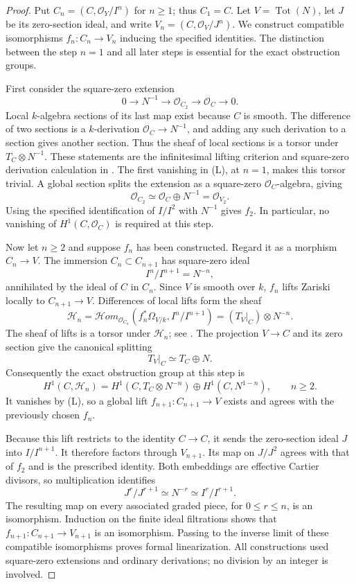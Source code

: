 \begin{proof}
Put $C_n=(C,\mathcal O_Y/I^n)$ for $n\geq1$; thus $C_1=C$.
Let $V=\operatorname{Tot}(N)$, let $J$ be its zero-section ideal,
and write $V_n=(C,\mathcal O_V/J^n)$.  We construct compatible
isomorphisms $f_n:C_n\to V_n$ inducing the specified identities.
The distinction between the step $n=1$ and all later steps is
essential for the exact obstruction groups.

First consider the square-zero extension
\[
 0\longrightarrow N^{-1}\longrightarrow\mathcal O_{C_2}
   \longrightarrow\mathcal O_C\longrightarrow0.
\]
Local $k$-algebra sections of its last map exist because $C$ is
smooth.  The difference of two sections is a $k$-derivation
$\mathcal O_C\to N^{-1}$, and adding any such derivation to a
section gives another section.  Thus the sheaf of local sections
is a torsor under $T_C\otimes N^{-1}$.  These statements are the
infinitesimal lifting criterion and square-zero derivation
calculation in
\cite[Lemmas 37.11.7 and 17.28.11, tags 02H6 and 01UP]
     {StacksBNegativeCurve}.
The first vanishing in (L), at $n=1$, makes this torsor trivial.
A global section splits the extension as a square-zero
$\mathcal O_C$-algebra, giving
\[
 \mathcal O_{C_2}\simeq\mathcal O_C\oplus N^{-1}
                       =\mathcal O_{V_2}.
\]
Using the specified identification of $I/I^2$ with $N^{-1}$
gives $f_2$.  In particular, no vanishing of $H^1(C,\mathcal O_C)$
is required at this step.

Now let $n\geq2$ and suppose $f_n$ has been constructed.
Regard it as a morphism $C_n\to V$.  The immersion
$C_n\subset C_{n+1}$ has square-zero ideal
\[
 I^n/I^{n+1}=N^{-n},
\]
annihilated by the ideal of $C$ in $C_n$.  Since $V$ is smooth
over $k$, $f_n$ lifts Zariski locally to $C_{n+1}\to V$.
Differences of local lifts form the sheaf
\[
 \mathcal H_n
  =\mathcal Hom_{\mathcal O_{C_n}}
       (f_n^*\Omega_{V/k},I^n/I^{n+1})
  =(T_V|_C)\otimes N^{-n}.
\]
The sheaf of lifts is a torsor under $\mathcal H_n$;
see \cite[Lemmas 37.9.4--5 and 37.11.7,
tags 04FH, 04FJ and 02H6]{StacksBNegativeCurve}.
The projection $V\to C$ and its zero section give the canonical
splitting
\[
 T_V|_C\simeq T_C\oplus N.
\]
Consequently the exact obstruction group at this step is
\[
 H^1(C,\mathcal H_n)
  =H^1(C,T_C\otimes N^{-n})\oplus H^1(C,N^{1-n}),
                  \qquad n\geq2.
 \tag{O}
\]
It vanishes by (L), so a global lift $f_{n+1}:C_{n+1}\to V$
exists and agrees with the previously chosen $f_n$.

Because this lift restricts to the identity $C\to C$, it sends
the zero-section ideal $J$ into $I/I^{n+1}$.  It therefore
factors through $V_{n+1}$.  Its map on $J/J^2$ agrees with that
of $f_2$ and is the prescribed identity.  Both embeddings are
effective Cartier divisors, so multiplication identifies
\[
 J^r/J^{r+1}\simeq N^{-r}\simeq I^r/I^{r+1}.
\]
The resulting map on every associated graded piece, for
$0\leq r\leq n$, is an isomorphism.  Induction on the finite
ideal filtrations shows that $f_{n+1}:C_{n+1}\to V_{n+1}$ is
an isomorphism.  Passing to the inverse limit of these
compatible isomorphisms proves formal linearization.
All constructions used square-zero extensions and ordinary
derivations; no division by an integer is involved.


\end{proof}
